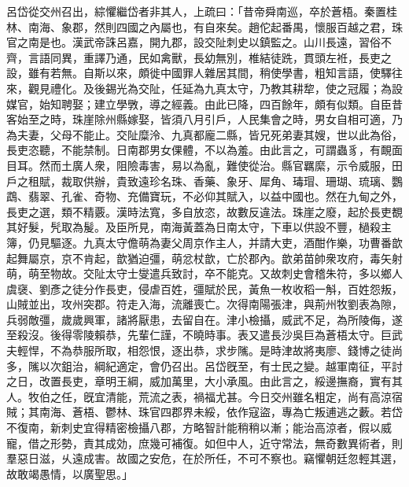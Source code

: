 \begin{pinyinscope}
呂岱從交州召出，綜懼繼岱者非其人，上疏曰：「昔帝舜南巡，卒於蒼梧。秦置桂林、南海、象郡，然則四國之內屬也，有自來矣。趙佗起番禺，懷服百越之君，珠官之南是也。漢武帝誅呂嘉，開九郡，設交阯刺史以鎮監之。山川長遠，習俗不齊，言語同異，重譯乃通，民如禽獸，長幼無別，椎結徒跣，貫頭左袵，長吏之設，雖有若無。自斯以來，頗徙中國罪人雜居其間，稍使學書，粗知言語，使驛往來，觀見禮化。及後錫光為交阯，任延為九真太守，乃教其耕犂，使之冠履；為設媒官，始知聘娶；建立學斆，導之經義。由此已降，四百餘年，頗有似類。自臣昔客始至之時，珠崖除州縣嫁娶，皆須八月引戶，人民集會之時，男女自相可適，乃為夫妻，父母不能止。交阯糜泠、九真都龐二縣，皆兄死弟妻其嫂，世以此為俗，長吏恣聽，不能禁制。日南郡男女倮體，不以為羞。由此言之，可謂蟲豸，有靦面目耳。然而土廣人衆，阻險毒害，易以為亂，難使從治。縣官羈縻，示令威服，田戶之租賦，裁取供辦，貴致遠珍名珠、香藥、象牙、犀角、瑇瑁、珊瑚、琉璃、鸚鵡、翡翠、孔雀、奇物、充備寶玩，不必仰其賦入，以益中國也。然在九甸之外，長吏之選，類不精覈。漢時法寬，多自放恣，故數反違法。珠崖之廢，起於長吏覩其好髮，髠取為髲。及臣所見，南海黃蓋為日南太守，下車以供設不豐，檛殺主簿，仍見驅逐。九真太守儋萌為妻父周京作主人，并請大吏，酒酣作樂，功曹番歆起舞屬京，京不肯起，歆猶迫彊，萌忿杖歆，亡於郡內。歆弟苗帥衆攻府，毒矢射萌，萌至物故。交阯太守士燮遣兵致討，卒不能克。又故刺史會稽朱符，多以鄉人虞襃、劉彥之徒分作長吏，侵虐百姓，彊賦於民，黃魚一枚收稻一斛，百姓怨叛，山賊並出，攻州突郡。符走入海，流離喪亡。次得南陽張津，與荊州牧劉表為隙，兵弱敵彊，歲歲興軍，諸將厭患，去留自在。津小檢攝，威武不足，為所陵侮，遂至殺沒。後得零陵賴恭，先輩仁謹，不曉時事。表又遣長沙吳巨為蒼梧太守。巨武夫輕悍，不為恭服所取，相怨恨，逐出恭，求步隲。是時津故將夷廖、錢博之徒尚多，隲以次鉏治，綱紀適定，會仍召出。呂岱旣至，有士民之變。越軍南征，平討之日，改置長吏，章明王綱，威加萬里，大小承風。由此言之，綏邊撫裔，實有其人。牧伯之任，旣宜清能，荒流之表，禍福尤甚。今日交州雖名粗定，尚有高涼宿賊；其南海、蒼梧、鬱林、珠官四郡界未綏，依作寇盜，專為亡叛逋逃之藪。若岱不復南，新刺史宜得精密檢攝八郡，方略智計能稍稍以漸；能治高涼者，假以威寵，借之形勢，責其成効，庶幾可補復。如但中人，近守常法，無奇數異術者，則羣惡日滋，乆遠成害。故國之安危，在於所任，不可不察也。竊懼朝廷忽輕其選，故敢竭愚情，以廣聖思。」


\end{pinyinscope}
